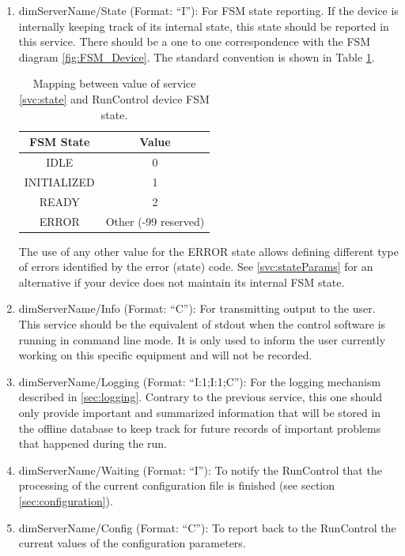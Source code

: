 \documentclass[a4paper]{article}
\begin{document}
\begin{enumerate}[label=\textbf{SVC.\arabic*}]
	\item \label{svc:state} dimServerName/State (Format: ``I''): For FSM state reporting. If the device
	is internally keeping track of its internal state, this state should be reported in this service. There should
	be a one to one correspondence with the FSM diagram \ref{fig:FSM_Device}. The standard convention
	is shown in Table \ref{table:FSMStates}.
	\begin{table}
		\center
		\begin{tabular}{c|c}
			FSM State & Value\\
			\hline
			IDLE & 0\\
			INITIALIZED & 1\\
			READY & 2\\
			ERROR & Other (-99 reserved)\\
			\hline
		\end{tabular}
		\caption{Mapping between value of service \ref{svc:state} and RunControl device FSM state.}
		\label{table:FSMStates}
	\end{table}
	The use of any other value for the ERROR state allows defining different type of errors identified
	by the error (state) code. See \ref{svc:stateParams} for an alternative if your device does not
	maintain its internal FSM state.
	\item \label{svc:info} dimServerName/Info (Format: ``C''): For transmitting output to the user. This
	service should be the equivalent of stdout when the control software is running in command line
	mode. It is only used to inform the user currently working on this specific equipment and will not
	be recorded.
	\item \label{svc:logging} dimServerName/Logging (Format: ``I:1;I:1;C''): For the logging mechanism
	described in \ref{sec:logging}. Contrary to the previous service, this one should only provide important and
	summarized information that will be stored in the offline database to keep track for future records
	of important problems that happened during the run.
	\item \label{svc:waiting} dimServerName/Waiting (Format: ``I''): To notify the RunControl that the
	processing of the current configuration file is finished (see section \ref{sec:configuration}).
	\item \label{svc:config} dimServerName/Config (Format: ``C''): To report back to the RunControl the
	current values of the configuration parameters.
\end{enumerate}
\end{document}
